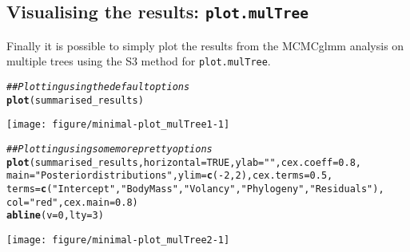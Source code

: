 \documentclass{article}\usepackage[]{graphicx}\usepackage[]{color}
\makeatletter
\newcommand{\hlnum}[1]{\textcolor[rgb]{0.686,0.059,0.569}{#1}}%
\newcommand{\hlstr}[1]{\textcolor[rgb]{0.192,0.494,0.8}{#1}}%
\newcommand{\hlcom}[1]{\textcolor[rgb]{0.678,0.584,0.686}{\textit{#1}}}%
\newcommand{\hlopt}[1]{\textcolor[rgb]{0,0,0}{#1}}%
\newcommand{\hlstd}[1]{\textcolor[rgb]{0.345,0.345,0.345}{#1}}%
\newcommand{\hlkwc}[1]{\textcolor[rgb]{0.333,0.667,0.333}{#1}}%
\newcommand{\hlkwd}[1]{\textcolor[rgb]{0.737,0.353,0.396}{\textbf{#1}}}%
\newenvironment{kframe}{%
 \def\at@end@of@kframe{}%
 \ifinner\ifhmode%
  \def\at@end@of@kframe{\end{minipage}}%
  \begin{minipage}{\columnwidth}%
 \fi\fi%
 \def\FrameCommand##1{\hskip\@totalleftmargin \hskip-\fboxsep
 \colorbox{shadecolor}{##1}\hskip-\fboxsep
     \hskip-\linewidth \hskip-\@totalleftmargin \hskip\columnwidth}%
 \MakeFramed {\advance\hsize-\width
   \@totalleftmargin\z@ \linewidth\hsize
   \@setminipage}}%
 {\par\unskip\endMakeFramed%
 \at@end@of@kframe}
\newenvironment{knitrout}{}{} %
\makeatother
\begin{document}
\subsection{Visualising the results: \texttt{plot.mulTree}}
Finally it is possible to simply plot the results from the MCMCglmm analysis on multiple trees using the S3 method for \texttt{plot.mulTree}. 

\begin{knitrout}
\color{fgcolor}\begin{kframe}
\begin{alltt}
\hlcom{## Plotting using the default options}
\hlkwd{plot}\hlstd{(summarised_results)}
\end{alltt}
\end{kframe}

{\centering \texttt{[image: figure/minimal-plot\_mulTree1-1]} 

}



\end{knitrout}

\begin{knitrout}
\color{fgcolor}\begin{kframe}
\begin{alltt}
\hlcom{## Plotting using some more pretty options}
\hlkwd{plot}\hlstd{(summarised_results,} \hlkwc{horizontal} \hlstd{=} \hlnum{TRUE}\hlstd{,} \hlkwc{ylab} \hlstd{=} \hlstr{""}\hlstd{,} \hlkwc{cex.coeff} \hlstd{=} \hlnum{0.8}\hlstd{,}
    \hlkwc{main} \hlstd{=} \hlstr{"Posterior distributions"}\hlstd{,} \hlkwc{ylim} \hlstd{=} \hlkwd{c}\hlstd{(}\hlopt{-}\hlnum{2}\hlstd{,}\hlnum{2}\hlstd{),} \hlkwc{cex.terms} \hlstd{=} \hlnum{0.5}\hlstd{,}
    \hlkwc{terms} \hlstd{=} \hlkwd{c}\hlstd{(}\hlstr{"Intercept"}\hlstd{,} \hlstr{"Body Mass"}\hlstd{,} \hlstr{"Volancy"}\hlstd{,} \hlstr{"Phylogeny"}\hlstd{,} \hlstr{"Residuals"}\hlstd{),}
    \hlkwc{col} \hlstd{=} \hlstr{"red"}\hlstd{,} \hlkwc{cex.main} \hlstd{=} \hlnum{0.8}\hlstd{)}
\hlkwd{abline}\hlstd{(}\hlkwc{v} \hlstd{=} \hlnum{0}\hlstd{,} \hlkwc{lty} \hlstd{=} \hlnum{3}\hlstd{)}
\end{alltt}
\end{kframe}

{\centering \texttt{[image: figure/minimal-plot\_mulTree2-1]} 

}



\end{knitrout}
\end{document}
